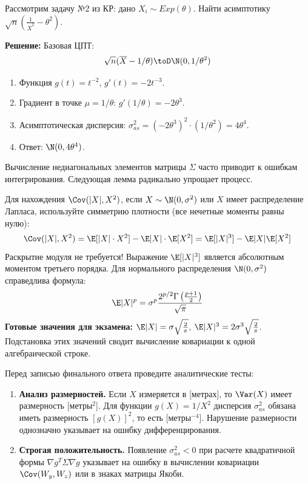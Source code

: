 Рассмотрим задачу №2 из КР: дано $X_i \sim Exp(\theta)$. Найти асимптотику $\sqrt{n}\left(\frac{1}{\overline{X}^2} - \theta^2\right)$.


\textbf{Решение:} Базовая ЦПТ: $$\sqrt{n}(\overline{X} - 1/\theta) \toD \N(0, 1/\theta^2)$$ 
\begin{enumerate}
    \item Функция $g(t) = t^{-2}$, $g'(t) = -2t^{-3}$.
    \item Градиент в точке $\mu = 1/\theta$: $g'(1/\theta) = -2\theta^3$.
    \item Асимптотическая дисперсия: $\sigma^2_{as} = (-2\theta^3)^2 \cdot (1/\theta^2) = 4\theta^4$.
    \item Ответ: $\N(0, 4\theta^4)$.
\end{enumerate}

Вычисление недиагональных элементов матрицы $\Sigma$ часто приводит к ошибкам интегрирования. Следующая лемма радикально упрощает процесс.

\begin{HackBox}
Для нахождения $\Cov(|X|, X^2)$, если $X \sim \N(0, \sigma^2)$ или $X$ имеет распределение Лапласа, используйте симметрию плотности (все нечетные моменты равны нулю):
\[
    \Cov(|X|, X^2) = \E[|X| \cdot X^2] - \E|X| \cdot \E[X^2] = \E[|X|^3] - \E|X|\E[X^2]
\]
Раскрытие модуля не требуется! Выражение $\E[|X|^3]$ является абсолютным моментом третьего порядка. Для нормального распределения $\N(0, \sigma^2)$ справедлива формула:
\[
    \E|X|^p = \sigma^p \frac{2^{p/2} \Gamma\left(\frac{p+1}{2}\right)}{\sqrt{\pi}}
\]
\textbf{Готовые значения для экзамена:} $\E|X| = \sigma \sqrt{\frac{2}{\pi}}$, \quad $\E|X|^3 = 2\sigma^3 \sqrt{\frac{2}{\pi}}$.
Подстановка этих значений сводит вычисление ковариации к одной алгебраической строке.
\end{HackBox}

\begin{HackBox}
Перед записью финального ответа проведите аналитические тесты:
\begin{enumerate}[label=\textbf{\arabic*.}]
    \item \textbf{Анализ размерностей.} Если $X$ измеряется в [метрах], то $\Var(X)$ имеет размерность [метры$^2$]. Для функции $g(X) = 1/X^2$ дисперсия $\sigma^2_{as}$ обязана иметь размерность $[g(X)]^2$, то есть [метры$^{-4}$]. Нарушение размерности однозначно указывает на ошибку дифференцирования.
    \item \textbf{Строгая положительность.} Появление $\sigma^2_{as} < 0$ при расчете квадратичной формы $\nabla g^T \Sigma \nabla g$ указывает на ошибку в вычислении ковариации $\Cov(W_y, W_z)$ или в знаках матрицы Якоби.
\end{enumerate}
\end{HackBox}

